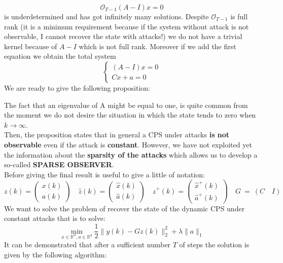\begin{equation*}
	\mathcal{O}_{T-1}(A-I)x=0
\end{equation*}
is underdetermined and has got infinitely many solutions. Despite $\mathcal{O}_{T-1}$ is full rank (it is a minimum requirement because if the system without attack is not observable, I cannot recover the state with attacks!) we do not have a trivial kernel because of $A-I$ which is not full rank. Moreover if we add the first equation we obtain the total system
\begin{equation*}
	\begin{cases}
		(A-I)x=0\\
		Cx+a=0
	\end{cases}
\end{equation*}
We are ready to give the following proposition:\\

\hspace*{-5mm}
%

\noindent
The fact that an eigenvalue of A might be equal to one, is quite common from the moment we do not desire the situation in which the state tends to zero when $k\rightarrow\infty$.\\
Then, the proposition states that in general a CPS under attacks \textbf{is not observable} even if the attack is \textbf{constant}. However, we have not exploited yet the information about the \textbf{sparsity of the attacks} which allows us to develop a so-called \textbf{{\color{red} SPARSE OBSERVER}}. \\
Before giving the final result is useful to give a little of notation:
\begin{equation*}
	z(k) = \begin{pmatrix}
		x(k)\\a(k)
	\end{pmatrix}		\quad
	\hat{z}(k) = \begin{pmatrix}
		\hat{x}(k)\\\hat{a}(k)  
	\end{pmatrix}		\quad
	\hat{z}^{+}(k)=\begin{pmatrix}
		\hat{x}^+(k)\\\hat{a}^+(k)
	\end{pmatrix}		\quad
	G \ = \ (C \quad I)
\end{equation*}
We want to solve the problem of recover the state of the dynamic CPS under constant attacks that is to solve:
\begin{equation*}
	\min_{x\in\mathbb{R}^n, a \in \mathbb{R}^q}
	\frac{1}{2} \lVert y(k) - Gz(k) \rVert_2^2 + 
	\lambda \lVert a \rVert_1
\end{equation*}
It can be demonstrated that after a sufficient number $T$ of steps the solution is given by the following algorithm:\\

